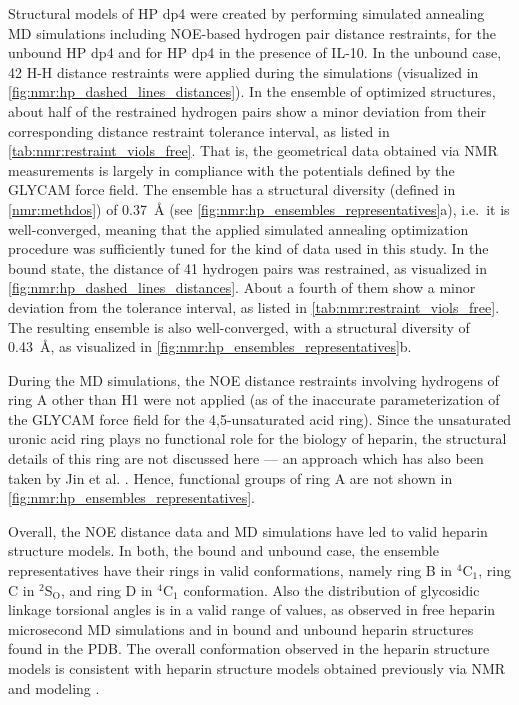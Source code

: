 Structural models of HP dp4 were created by performing simulated annealing MD
simulations including NOE-based hydrogen pair distance restraints, for the
unbound HP dp4 and for HP dp4 in the presence of IL-10. In the unbound case, 42
H-H distance restraints were applied during the simulations (visualized in
\cref{fig:nmr:hp_dashed_lines_distances}). In the ensemble of optimized
structures, about half of the restrained hydrogen pairs show a minor deviation
from their corresponding distance restraint tolerance interval, as listed in
\cref{tab:nmr:restraint_viols_free}. That is, the geometrical data obtained via
NMR measurements is largely in compliance with the potentials defined by the
GLYCAM force field. The ensemble has a structural diversity (defined in
\cref{nmr:methdos}) of \SI{0.37}{\angstrom}
(see \cref{fig:nmr:hp_ensembles_representatives}a), i.e.\ it is well-converged,
meaning that the applied simulated annealing optimization procedure was
sufficiently tuned for the kind of data used in this study. In the bound state,
the distance of 41 hydrogen pairs was restrained, as visualized in
\cref{fig:nmr:hp_dashed_lines_distances}. About a fourth of them show a minor
deviation from the tolerance interval, as listed in
\cref{tab:nmr:restraint_viols_free}. The resulting ensemble is also
well-converged, with a structural diversity of \SI{0.43}{\angstrom}, as
visualized in \cref{fig:nmr:hp_ensembles_representatives}b.

During the MD simulations, the NOE distance restraints involving hydrogens of
ring A other than H1 were not applied (as of the inaccurate parameterization of
the GLYCAM force field for the 4,5-unsaturated acid ring). Since the unsaturated
uronic acid ring plays no functional role for the biology of heparin, the
structural details of this ring are not discussed here --- an approach which has
also been taken by Jin et al. \cite{jin_heparin_2009}. Hence, functional groups
of ring A are not shown in \cref{fig:nmr:hp_ensembles_representatives}.

Overall, the NOE distance data and MD simulations have led to valid heparin
structure models. In both, the bound and unbound case, the ensemble
representatives have their rings in valid conformations, namely ring B in
${}^4$C${}_1$, ring C in ${}^2$S${}_\mathrm{O}$, and ring D in ${}^4$C${}_1$
conformation. Also the distribution of glycosidic linkage torsional angles is in
a valid range of values, as observed in free heparin microsecond MD simulations
and in bound and unbound heparin structures found in the PDB. The overall
conformation observed in the heparin structure models is consistent with heparin
structure models obtained previously via NMR and modeling
\cite{foster_mulloy_1993}.

